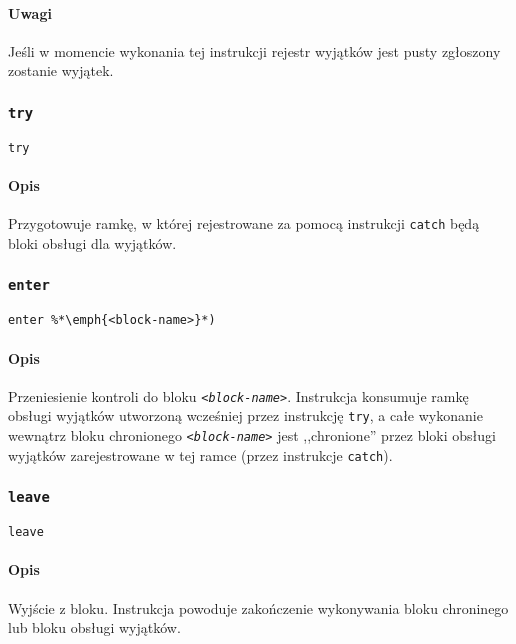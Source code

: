 \paragraph*{Uwagi} Jeśli w momencie wykonania tej instrukcji rejestr wyjątków
jest pusty zgłoszony zostanie wyjątek.

\subsubsection{\texttt{try}}

\begin{lstlisting}
try
\end{lstlisting}

\paragraph*{Opis} Przygotowuje ramkę, w której rejestrowane za pomocą instrukcji
\texttt{catch} będą bloki obsługi dla wyjątków.

\subsubsection{\texttt{enter}}

\begin{lstlisting}
enter %*\emph{<block-name>}*)
\end{lstlisting}

\paragraph*{Opis} Przeniesienie kontroli do bloku \texttt{\emph{<block-name>}}.
Instrukcja konsumuje ramkę obsługi wyjątków utworzoną wcześniej przez instrukcję
\texttt{try}, a całe wykonanie wewnątrz bloku chronionego
\texttt{\emph{<block-name>}} jest ,,chronione'' przez bloki obsługi wyjątków
zarejestrowane w tej ramce (przez instrukcje \texttt{catch}).

\subsubsection{\texttt{leave}}

\begin{lstlisting}
leave
\end{lstlisting}

\paragraph*{Opis} Wyjście z bloku. Instrukcja powoduje zakończenie wykonywania
bloku chroninego lub bloku obsługi wyjątków.

